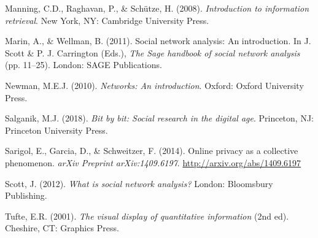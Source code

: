 \documentclass[
  letterpaper,
  DIV=11,
  numbers=noendperiod]{scrartcl}
\newlength{\cslhangindent}
\newenvironment{CSLReferences}[2] %
 {\begin{list}{}{%
  \setlength{\itemindent}{0pt}
  \setlength{\leftmargin}{0pt}
  \setlength{\parsep}{0pt}
  \ifodd #1
   \setlength{\leftmargin}{\cslhangindent}
   \setlength{\itemindent}{-1\cslhangindent}
  \fi
  \setlength{\itemsep}{#2\baselineskip}}}
 {\end{list}}
\begin{document}
\begin{CSLReferences}{1}{0}
Manning, C.D., Raghavan, P., \& Schütze, H. (2008). \emph{Introduction
to information retrieval}. New York, NY: Cambridge University Press.

Marin, A., \& Wellman, B. (2011). Social network analysis: {An}
introduction. In J. Scott \& P. J. Carrington (Eds.), \emph{The {Sage}
handbook of social network analysis} (pp. 11--25). London: SAGE
Publications.

Newman, M.E.J. (2010). \emph{Networks: An introduction}. Oxford: Oxford
University Press.

Salganik, M.J. (2018). \emph{Bit by bit: {Social} research in the
digital age}. Princeton, NJ: Princeton University Press.

Sarigol, E., Garcia, D., \& Schweitzer, F. (2014). Online privacy as a
collective phenomenon. \emph{arXiv Preprint arXiv:1409.6197}.
\url{http://arxiv.org/abs/1409.6197}

Scott, J. (2012). \emph{What is social network analysis?} London:
Bloomsbury Publishing.

Tufte, E.R. (2001). \emph{The visual display of quantitative
information} (2nd ed). Cheshire, CT: Graphics Press.

\end{CSLReferences}
\end{document}
